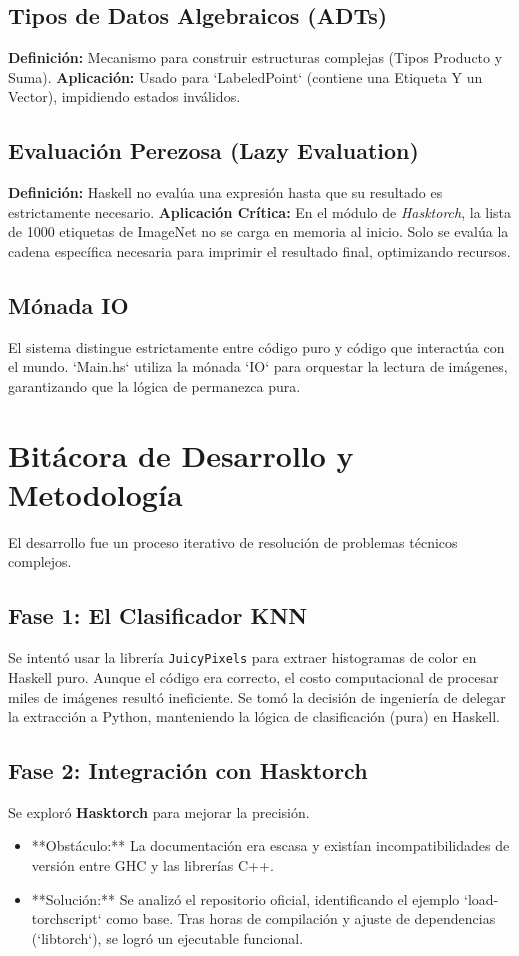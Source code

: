 \documentclass[12pt, letterpaper]{article}
\begin{document}
\subsection{Tipos de Datos Algebraicos (ADTs)}
\textbf{Definición:} Mecanismo para construir estructuras complejas (Tipos Producto y Suma).
\textbf{Aplicación:} Usado para `LabeledPoint` (contiene una Etiqueta Y un Vector), impidiendo estados inválidos.

\subsection{Evaluación Perezosa (Lazy Evaluation)}
\textbf{Definición:} Haskell no evalúa una expresión hasta que su resultado es estrictamente necesario.
\textbf{Aplicación Crítica:} En el módulo de \textit{Hasktorch}, la lista de 1000 etiquetas de ImageNet no se carga en memoria al inicio. Solo se evalúa la cadena específica necesaria para imprimir el resultado final, optimizando recursos.

\subsection{Mónada IO}
El sistema distingue estrictamente entre código puro y código que interactúa con el mundo. `Main.hs` utiliza la mónada `IO` para orquestar la lectura de imágenes, garantizando que la lógica de permanezca pura.

\section{Bitácora de Desarrollo y Metodología}

El desarrollo fue un proceso iterativo de resolución de problemas técnicos complejos.

\subsection{Fase 1: El Clasificador KNN}
Se intentó usar la librería \texttt{JuicyPixels} para extraer histogramas de color en Haskell puro. Aunque el código era correcto, el costo computacional de procesar miles de imágenes resultó ineficiente. Se tomó la decisión de ingeniería de delegar la extracción a Python, manteniendo la lógica de clasificación (pura) en Haskell.

\subsection{Fase 2: Integración con Hasktorch}
Se exploró \textbf{Hasktorch} para mejorar la precisión.
\begin{itemize}
    \item **Obstáculo:** La documentación era escasa y existían incompatibilidades de versión entre GHC y las librerías C++.
    \item **Solución:** Se analizó el repositorio oficial, identificando el ejemplo `load-torchscript` como base. Tras horas de compilación y ajuste de dependencias (`libtorch`), se logró un ejecutable funcional.
\end{itemize}
\end{document}

